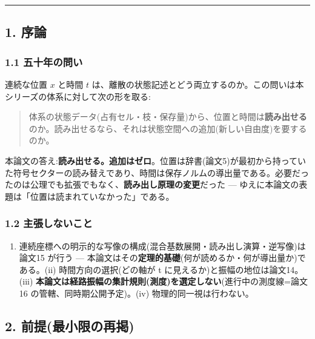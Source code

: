\documentclass[
]{ltjsarticle}
\providecommand{\tightlist}{%
  \setlength{\itemsep}{0pt}\setlength{\parskip}{0pt}}
\begin{document}
\begin{center}\rule{0.5\linewidth}{0.5pt}\end{center}

\subsection{1. 序論}\label{ux5e8fux8ad6}

\subsubsection{1.1
五十年の問い}\label{ux4e94ux5341ux5e74ux306eux554fux3044}

連続な位置 \(x\) と時間 \(t\)
は、離散の状態記述とどう両立するのか。この問いは本シリーズの体系に対して次の形を取る:

\begin{quote}
体系の状態データ(占有セル・枝・保存量)から、位置と時間は\textbf{読み出せる}のか。読み出せるなら、それは状態空間への追加(新しい自由度)を要するのか。
\end{quote}

本論文の答え:\textbf{読み出せる。追加はゼロ}。位置は辞書(論文5)が最初から持っていた符号セクターの読み替えであり、時間は保存ノルムの導出量である。必要だったのは公理でも拡張でもなく、\textbf{読み出し原理の変更}だった
--- ゆえに本論文の表題は「位置は読まれていなかった」である。

\subsubsection{1.2
主張しないこと}\label{ux4e3bux5f35ux3057ux306aux3044ux3053ux3068}

\begin{enumerate}
\def\labelenumi{(\roman{enumi})}
\tightlist
\item
  連続座標への明示的な写像の構成(混合基数展開・読み出し演算・逆写像)は論文15
  が行う ---
  本論文はその\textbf{定理的基礎}(何が読めるか・何が導出量か)である。(ii)
  時間方向の選択(どの軸が t に見えるか)と振幅の地位は論文14。(iii)
  \textbf{本論文は経路振幅の集計規則(測度)を選定しない}(進行中の測度線=論文16
  の管轄、同時期公開予定)。(iv) 物理的同一視は行わない。
\end{enumerate}

\subsection{2.
前提(最小限の再掲)}\label{ux524dux63d0ux6700ux5c0fux9650ux306eux518dux63b2}
\end{document}
